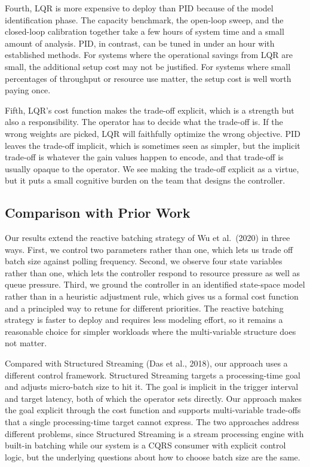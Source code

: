 \documentclass[10pt,a4paper]{article}
\begin{document}
Fourth, LQR is more expensive to deploy than PID because of the model identification phase. The capacity benchmark, the open-loop sweep, and the closed-loop calibration together take a few hours of system time and a small amount of analysis. PID, in contrast, can be tuned in under an hour with established methods. For systems where the operational savings from LQR are small, the additional setup cost may not be justified. For systems where small percentages of throughput or resource use matter, the setup cost is well worth paying once.

Fifth, LQR's cost function makes the trade-off explicit, which is a strength but also a responsibility. The operator has to decide what the trade-off is. If the wrong weights are picked, LQR will faithfully optimize the wrong objective. PID leaves the trade-off implicit, which is sometimes seen as simpler, but the implicit trade-off is whatever the gain values happen to encode, and that trade-off is usually opaque to the operator. We see making the trade-off explicit as a virtue, but it puts a small cognitive burden on the team that designs the controller.

\subsection{Comparison with Prior Work}

Our results extend the reactive batching strategy of Wu et al.\ (2020) in three ways. First, we control two parameters rather than one, which lets us trade off batch size against polling frequency. Second, we observe four state variables rather than one, which lets the controller respond to resource pressure as well as queue pressure. Third, we ground the controller in an identified state-space model rather than in a heuristic adjustment rule, which gives us a formal cost function and a principled way to retune for different priorities. The reactive batching strategy is faster to deploy and requires less modeling effort, so it remains a reasonable choice for simpler workloads where the multi-variable structure does not matter.

Compared with Structured Streaming (Das et al., 2018), our approach uses a different control framework. Structured Streaming targets a processing-time goal and adjusts micro-batch size to hit it. The goal is implicit in the trigger interval and target latency, both of which the operator sets directly. Our approach makes the goal explicit through the cost function and supports multi-variable trade-offs that a single processing-time target cannot express. The two approaches address different problems, since Structured Streaming is a stream processing engine with built-in batching while our system is a CQRS consumer with explicit control logic, but the underlying questions about how to choose batch size are the same.
\end{document}
